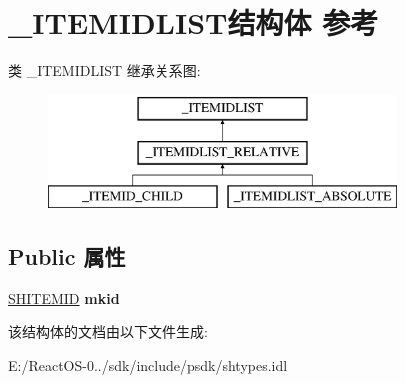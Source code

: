 \hypertarget{struct___i_t_e_m_i_d_l_i_s_t}{}\section{\+\_\+\+I\+T\+E\+M\+I\+D\+L\+I\+S\+T结构体 参考}
\label{struct___i_t_e_m_i_d_l_i_s_t}
类 \+\_\+\+I\+T\+E\+M\+I\+D\+L\+I\+ST 继承关系图\+:\begin{figure}[H]
\begin{center}
\leavevmode
\includegraphics[height=3.000000cm]{struct___i_t_e_m_i_d_l_i_s_t}
\end{center}
\end{figure}
\subsection*{Public 属性}
\begin{DoxyCompactItemize}
\item 
\mbox{\label{struct___i_t_e_m_i_d_l_i_s_t_a0fc918761297b3282aae228e29ecb099}} 
\hyperlink{struct_s_h_i_t_e_m_i_d}{S\+H\+I\+T\+E\+M\+ID} {\bfseries mkid}
\end{DoxyCompactItemize}


该结构体的文档由以下文件生成\+:\begin{DoxyCompactItemize}
\item 
E\+:/\+React\+O\+S-\/0../sdk/include/psdk/shtypes.\+idl\end{DoxyCompactItemize}
